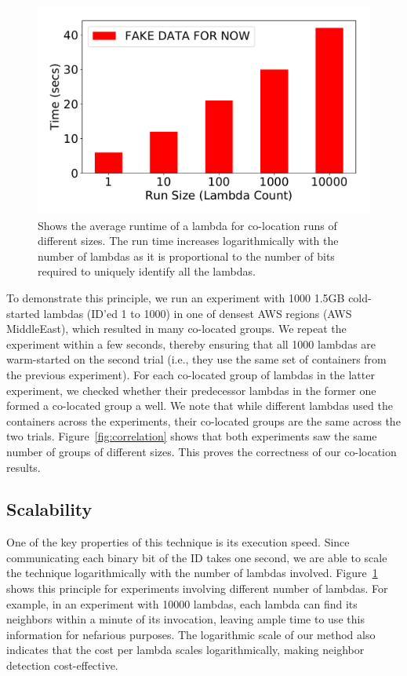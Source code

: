 \begin{figure}[!t]
  \includegraphics[width=.99\linewidth]{fig/runtimes.pdf}
  \caption{Shows the average runtime of a lambda for co-location runs of different sizes. 
  The run time increases logarithmically with the number of lambdas as it is proportional to
  the number of bits required to uniquely identify all the lambdas. 
\label{fig:runtimes}}
\end{figure}

To demonstrate this principle, we run an experiment with 1000 1.5GB cold-started
lambdas (ID'ed 1 to 1000) in one of densest AWS regions (AWS MiddleEast), which
resulted in many co-located groups.  We repeat the experiment within a few
seconds, thereby ensuring that all 1000 lambdas are warm-started on the second
trial (i.e., they use the same set of containers from the previous experiment).
For each co-located group of lambdas in the latter experiment, we checked
whether their predecessor lambdas in the former one formed a co-located group a
well. We note that while different lambdas used the
containers across the experiments, their co-located groups are the same across
the two trials.  Figure~\ref{fig:correlation} shows that both experiments saw
the same number of groups of different sizes. This proves the correctness of
our co-location results.

\subsection{Scalability}
One of the key properties of this technique is its execution speed.  Since
communicating each binary bit of the ID takes one second, we are able to scale
the technique logarithmically with the number of lambdas involved.
Figure~\ref{fig:runtimes} shows this principle for experiments involving
different number of lambdas. For example, in an experiment with 10000 lambdas,
each lambda can find its neighbors within a minute of its invocation, leaving
ample time to use this information for nefarious purposes. The logarithmic scale
of our method also indicates that the cost per lambda scales logarithmically,
making neighbor detection cost-effective.



